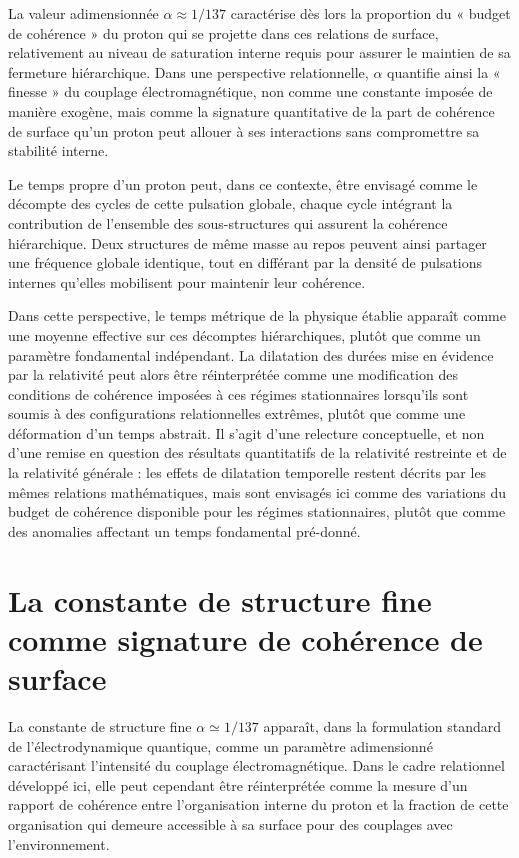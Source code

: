\documentclass[11pt,a4paper]{article}
\begin{document}
La valeur adimensionnée \(\alpha \approx 1/137\) caractérise dès lors la proportion du « budget de cohérence » du proton qui se projette dans ces relations de surface, relativement au niveau de saturation interne requis pour assurer le maintien de sa fermeture hiérarchique. Dans une perspective relationnelle, \(\alpha\) quantifie ainsi la « finesse » du couplage électromagnétique, non comme une constante imposée de manière exogène, mais comme la signature quantitative de la part de cohérence de surface qu’un proton peut allouer à ses interactions sans compromettre sa stabilité interne.

Le temps propre d’un proton peut, dans ce contexte, être envisagé comme le décompte des cycles de cette pulsation globale, chaque cycle intégrant la contribution de l’ensemble des sous-structures qui assurent la cohérence hiérarchique. Deux structures de même masse au repos peuvent ainsi partager une fréquence globale identique, tout en différant par la densité de pulsations internes qu’elles mobilisent pour maintenir leur cohérence.

Dans cette perspective, le temps métrique de la physique établie apparaît comme une moyenne effective sur ces décomptes hiérarchiques, plutôt que comme un paramètre fondamental indépendant. La dilatation des durées mise en évidence par la relativité peut alors être réinterprétée comme une modification des conditions de cohérence imposées à ces régimes stationnaires lorsqu’ils sont soumis à des configurations relationnelles extrêmes, plutôt que comme une déformation d’un temps abstrait. Il s’agit d’une relecture conceptuelle, et non d’une remise en question des résultats quantitatifs de la relativité restreinte et de la relativité générale : les effets de dilatation temporelle restent décrits par les mêmes relations mathématiques, mais sont envisagés ici comme des variations du budget de cohérence disponible pour les régimes stationnaires, plutôt que comme des anomalies affectant un temps fondamental pré-donné.

\section{La constante de structure fine comme signature de cohérence de surface}

La constante de structure fine \(\alpha \simeq 1/137\) apparaît, dans la formulation standard de l’électrodynamique quantique, comme un paramètre adimensionné caractérisant l’intensité du couplage électromagnétique. Dans le cadre relationnel développé ici, elle peut cependant être réinterprétée comme la mesure d’un rapport de cohérence entre l’organisation interne du proton et la fraction de cette organisation qui demeure accessible à sa surface pour des couplages avec l’environnement.
\end{document}

